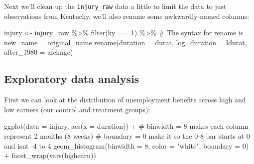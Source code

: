 \documentclass[
  letterpaper,
  DIV=11,
  numbers=noendperiod]{scrartcl}
\newenvironment{Shaded}{\begin{snugshade}}{\end{snugshade}}
\newcommand{\AttributeTok}[1]{\textcolor[rgb]{0.40,0.45,0.13}{#1}}
\newcommand{\CommentTok}[1]{\textcolor[rgb]{0.37,0.37,0.37}{#1}}
\newcommand{\DecValTok}[1]{\textcolor[rgb]{0.68,0.00,0.00}{#1}}
\newcommand{\FunctionTok}[1]{\textcolor[rgb]{0.28,0.35,0.67}{#1}}
\newcommand{\NormalTok}[1]{\textcolor[rgb]{0.00,0.23,0.31}{#1}}
\newcommand{\OtherTok}[1]{\textcolor[rgb]{0.00,0.23,0.31}{#1}}
\newcommand{\SpecialCharTok}[1]{\textcolor[rgb]{0.37,0.37,0.37}{#1}}
\newcommand{\StringTok}[1]{\textcolor[rgb]{0.13,0.47,0.30}{#1}}
\begin{document}
Next we'll clean up the \texttt{injury\_raw} data a little to limit the
data to just observations from Kentucky. we'll also rename some
awkwardly-named columns:

\begin{Shaded}
\begin{Highlighting}[]
\NormalTok{injury }\OtherTok{\textless{}{-}}\NormalTok{ injury\_raw }\SpecialCharTok{\%\textgreater{}\%}
  \FunctionTok{filter}\NormalTok{(ky }\SpecialCharTok{==} \DecValTok{1}\NormalTok{) }\SpecialCharTok{\%\textgreater{}\%}
  \CommentTok{\# The syntax for rename is \textasciigrave{}new\_name = original\_name\textasciigrave{}}
  \FunctionTok{rename}\NormalTok{(}\AttributeTok{duration =}\NormalTok{ durat, }\AttributeTok{log\_duration =}\NormalTok{ ldurat,}
         \AttributeTok{after\_1980 =}\NormalTok{ afchnge)}
\end{Highlighting}
\end{Shaded}

\hypertarget{exploratory-data-analysis}{%
\subsection{Exploratory data analysis}\label{exploratory-data-analysis}}

First we can look at the distribution of unemployment benefits across
high and low earners (our control and treatment groups):

\begin{Shaded}
\begin{Highlighting}[]
\FunctionTok{ggplot}\NormalTok{(}\AttributeTok{data =}\NormalTok{ injury, }\FunctionTok{aes}\NormalTok{(}\AttributeTok{x =}\NormalTok{ duration)) }\SpecialCharTok{+}
  \CommentTok{\# binwidth = 8 makes each column represent 2 months (8 weeks)}
  \CommentTok{\# boundary = 0 make it so the 0{-}8 bar starts at 0 and isn\textquotesingle{}t {-}4 to 4}
  \FunctionTok{geom\_histogram}\NormalTok{(}\AttributeTok{binwidth =} \DecValTok{8}\NormalTok{, }\AttributeTok{color =} \StringTok{"white"}\NormalTok{, }\AttributeTok{boundary =} \DecValTok{0}\NormalTok{) }\SpecialCharTok{+}
  \FunctionTok{facet\_wrap}\NormalTok{(}\FunctionTok{vars}\NormalTok{(highearn))}
\end{Highlighting}
\end{Shaded}
\end{document}

